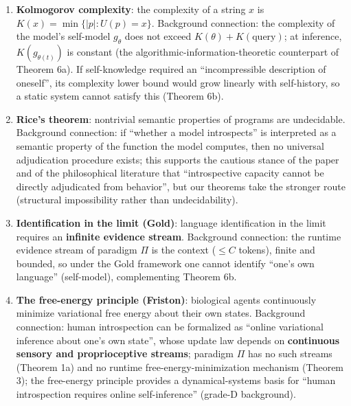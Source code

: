 \begin{enumerate}
\item \textbf{Kolmogorov complexity}\cite{kolmogorov-1965}: the complexity of a string $x$ is
$K(x) = \min\{|p| : U(p) = x\}$. Background connection: the complexity of the model's
self-model $g_\theta$ does not exceed $K(\theta) + K(\text{query})$; at inference,
$K(g_{\theta(t)})$ is constant (the algorithmic-information-theoretic counterpart of Theorem
6a). If self-knowledge required an ``incompressible description of oneself'', its complexity
lower bound would grow linearly with self-history, so a static system cannot satisfy this
(Theorem 6b).
\item \textbf{Rice's theorem}\cite{rice-1953}: nontrivial semantic properties of programs are
undecidable. Background connection: if ``whether a model introspects'' is interpreted as a
semantic property of the function the model computes, then no universal adjudication
procedure exists; this supports the cautious stance of the paper and of the philosophical
literature that ``introspective capacity cannot be directly adjudicated from behavior'', but
our theorems take the stronger route (structural impossibility rather than
undecidability).
\item \textbf{Identification in the limit (Gold)}\cite{gold-1967}: language identification in
the limit requires an \textbf{infinite evidence stream}. Background connection: the runtime
evidence stream of paradigm $\Pi$ is the context ($\le C$ tokens), finite and bounded, so
under the Gold framework one cannot identify ``one's own language'' (self-model), complementing
Theorem 6b.
\item \textbf{The free-energy principle (Friston)}\cite{friston-2010}: biological agents
continuously minimize variational free energy about their own states. Background connection:
human introspection can be formalized as ``online variational inference about one's own
state'', whose update law depends on \textbf{continuous sensory and proprioceptive streams};
paradigm $\Pi$ has no such streams (Theorem 1a) and no runtime free-energy-minimization
mechanism (Theorem 3); the free-energy principle provides a dynamical-systems basis for
``human introspection requires online self-inference'' (grade-D background).
\end{enumerate}

\clearpage
